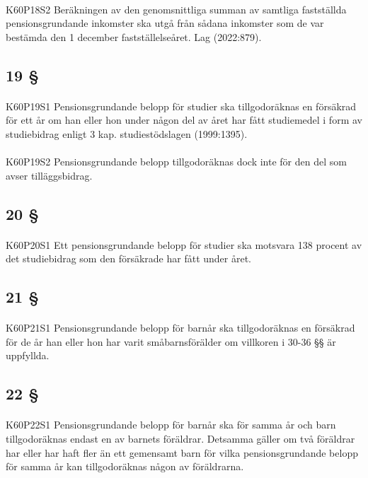 \documentclass[a4paper,notitlepage,openany,10pt]{book}
\begin{document}
\paragraph*{}
{\tiny K60P18S2}
Beräkningen av den genomsnittliga summan av samtliga fastställda pensionsgrundande inkomster ska utgå från sådana inkomster som de var bestämda den 1 december fastställelseåret.
Lag (2022:879).
\subsection*{19 §}
\paragraph*{}
{\tiny K60P19S1}
Pensionsgrundande belopp för studier ska tillgodoräknas en försäkrad för ett år om han eller hon under någon del av året har fått studiemedel i form av studiebidrag enligt 3 kap. studiestödslagen (1999:1395).
\paragraph*{}
{\tiny K60P19S2}
Pensionsgrundande belopp tillgodoräknas dock inte för den del som avser tilläggsbidrag.
\subsection*{20 §}
\paragraph*{}
{\tiny K60P20S1}
Ett pensionsgrundande belopp för studier ska motsvara 138 procent av det studiebidrag som den försäkrade har fått under året.
\subsection*{21 §}
\paragraph*{}
{\tiny K60P21S1}
Pensionsgrundande belopp för barnår ska tillgodoräknas en försäkrad för de år han eller hon har varit småbarnsförälder om villkoren i 30-36 §§ är uppfyllda.
\subsection*{22 §}
\paragraph*{}
{\tiny K60P22S1}
Pensionsgrundande belopp för barnår ska för samma år och barn tillgodoräknas endast en av barnets föräldrar. Detsamma gäller om två föräldrar har eller har haft fler än ett gemensamt barn för vilka pensionsgrundande belopp för samma år kan tillgodoräknas någon av föräldrarna.
\end{document}
